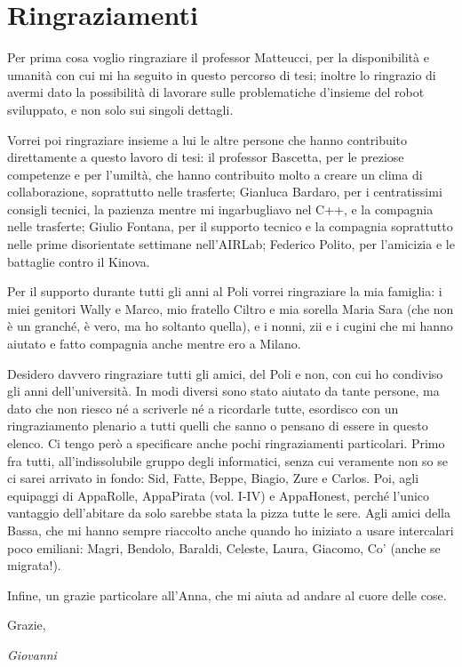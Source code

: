 
\bigskip

\begingroup
\let\clearpage\relax
\let\cleardoublepage\relax
\let\cleardoublepage\relax
\chapter*{Ringraziamenti}
Per prima cosa voglio ringraziare il professor Matteucci, per la disponibilità e umanità con cui mi ha seguito in questo percorso di tesi; inoltre lo ringrazio di avermi dato la possibilità di lavorare sulle problematiche d'insieme del robot sviluppato, e non solo sui singoli dettagli.
\par Vorrei poi ringraziare insieme a lui le altre persone che hanno contribuito direttamente a questo lavoro di tesi: il professor Bascetta, per le preziose competenze e per l'umiltà, che hanno contribuito molto a creare un clima di collaborazione, soprattutto nelle trasferte; Gianluca Bardaro, per i centratissimi consigli tecnici, la pazienza mentre mi ingarbugliavo nel C++, e la compagnia nelle trasferte; Giulio Fontana, per il supporto tecnico e la compagnia soprattutto nelle prime disorientate settimane nell'AIRLab; Federico Polito, per l'amicizia e le battaglie contro il Kinova.
\par Per il supporto durante tutti gli anni al Poli vorrei ringraziare la mia famiglia: i miei genitori Wally e Marco, mio fratello Ciltro e mia sorella Maria Sara (che non è un granché, è vero, ma ho soltanto quella), e i nonni, zii e i cugini che mi hanno aiutato e fatto compagnia anche mentre ero a Milano. 
\par Desidero davvero ringraziare tutti gli amici, del Poli e non, con cui ho condiviso gli anni dell'università. In modi diversi sono stato aiutato da tante persone, ma dato che non riesco né a scriverle né a ricordarle tutte, esordisco con un ringraziamento plenario a tutti quelli che sanno o pensano di essere in questo elenco. Ci tengo però a specificare anche  pochi ringraziamenti particolari. Primo fra tutti, all'indissolubile gruppo degli informatici, senza cui veramente non so se ci sarei arrivato in fondo: Sid, Fatte, Beppe, Biagio, Zure e Carlos.
Poi, agli equipaggi di AppaRolle, AppaPirata (vol. I-IV) e AppaHonest, perché l'unico vantaggio dell'abitare da solo sarebbe stata la pizza tutte le sere. Agli amici della Bassa, che mi hanno sempre riaccolto anche quando ho iniziato a usare intercalari poco emiliani: Magri, Bendolo, Baraldi, Celeste, Laura, Giacomo, Co' (anche se migrata!).
\par Infine, un grazie particolare all'Anna, che mi aiuta ad andare al cuore delle cose.
\par Grazie,
\begin{flushright}
\textit{Giovanni}
\end{flushright}


\endgroup